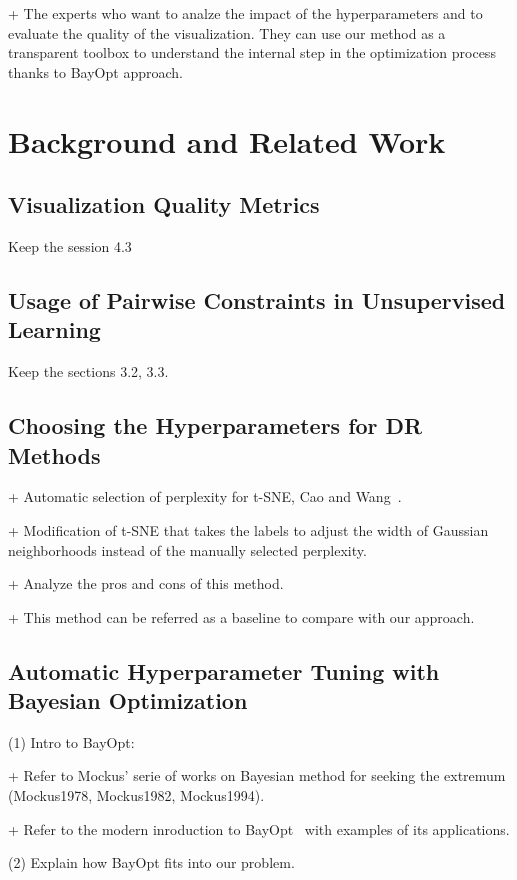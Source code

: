 + The experts who want to analze the impact of the hyperparameters and to evaluate the quality of the visualization.
They can use our method as a transparent toolbox to understand the internal step in the optimization process thanks to BayOpt approach.



\section{Background and Related Work}

\subsection{Visualization Quality Metrics}
Keep the session 4.3

\subsection{Usage of Pairwise Constraints in Unsupervised Learning}
Keep the sections 3.2, 3.3.

\subsection{Choosing the Hyperparameters for DR Methods}
+ Automatic selection of perplexity for t-SNE, Cao and Wang~\cite{cao2017automatic}.

+ Modification of t-SNE that takes the labels to adjust the width of Gaussian neighborhoods instead of the manually selected perplexity.

+ Analyze the pros and cons of this method.

+ This method can be referred as a baseline to compare with our approach.

\subsection{Automatic Hyperparameter Tuning with Bayesian Optimization}

(1) Intro to BayOpt:

+ Refer to Mockus' serie of works on Bayesian method for seeking the extremum (Mockus1978, Mockus1982, Mockus1994).

+ Refer to the modern inroduction to BayOpt~\cite{brochu2010tutorial} with examples of its applications.


\vspace{8pt} \par
(2) Explain how BayOpt fits into our problem.


